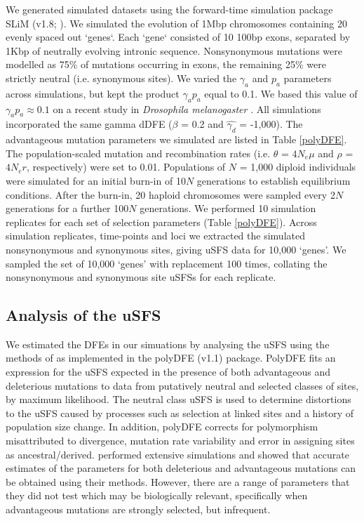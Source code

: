 	We generated simulated datasets using the forward-time simulation package SLiM (v1.8; \citealt{RN148}). We simulated the evolution of 1Mbp chromosomes containing 20 evenly spaced out `genes`. Each `gene` consisted of 10 100bp exons, separated by 1Kbp of neutrally evolving intronic sequence. Nonsynonymous mutations were modelled as 75\% of mutations occurring in exons, the remaining 25\% were strictly neutral (i.e. synonymous sites). We varied the $\gamma_a$ and $p_a$ parameters across simulations, but kept the product $\gamma_a p_a$ equal to 0.1. We based this value of $\gamma_a p_a \approx 0.1$ on a recent study in \textit{Drosophila melanogaster} \citep{RN321}. All simulations incorporated the same gamma dDFE ($\beta$ = 0.2 and $\hat{\gamma_d}$ = -1,000). The advantageous mutation parameters we simulated are listed in Table \ref{polyDFE}. 	The population-scaled mutation and recombination rates (i.e. $\theta$ = \emph{$4N_{e}\mu$} and $\rho$ = \emph{$4N_{e}r$}, respectively) were set to 0.01. Populations of $N$ = 1,000 diploid individuals were simulated for an initial burn-in of 10$N$ generations to establish equilibrium conditions. After the burn-in, 20 haploid chromosomes were sampled every 2$N$ generations for a further 100$N$ generations. We performed 10 simulation replicates for each set of selection parameters (Table \ref{polyDFE}). Across simulation replicates, time-points and loci we extracted the simulated nonsynonymous and synonymous sites, giving uSFS data for 10,000 `genes'. We sampled the set of 10,000 `genes' with replacement 100 times, collating the nonsynonymous and synonymous site uSFSs for each replicate.


	\subsection*{Analysis of the uSFS}

	
	We estimated the DFEs in our simuations by analysing the uSFS using the methods of \cite{RN354} as implemented in the polyDFE (v1.1) package. PolyDFE fits an expression for the uSFS expected in the presence of both advantageous and deleterious mutations to data from putatively neutral and selected classes of sites, by maximum likelihood. The neutral class uSFS is used to determine distortions to the uSFS caused by processes such as selection at linked sites and a history of population size change. In addition, polyDFE corrects for polymorphism misattributed to divergence, mutation rate variability and error in assigning sites as ancestral/derived. \cite{RN354} performed extensive simulations and showed that accurate estimates of the parameters for both deleterious and advantageous mutations can be obtained using their methods. However, there are a range of parameters that they did not test which may be biologically relevant, specifically when advantageous mutations are strongly selected, but infrequent.

